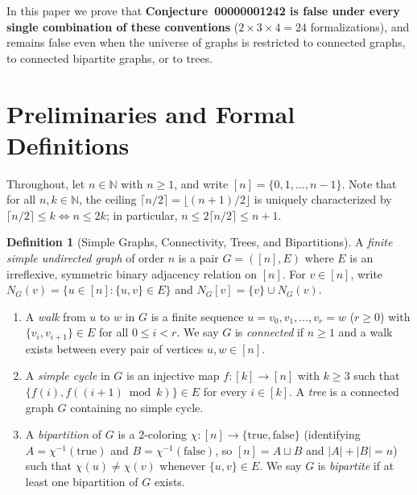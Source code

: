 \documentclass[11pt,a4paper]{article}
\theoremstyle{definition}
\newtheorem{definition}[theorem]{Definition}
\newcommand{\ceilhalf}[1]{\lceil #1 / 2 \rceil}
\begin{document}
In this paper we prove that \textbf{Conjecture~00000001242 is false under every
single combination of these conventions} ($2 \times 3 \times 4 = 24$ formalizations),
and remains false even when the universe of graphs is restricted to connected
graphs, to connected bipartite graphs, or to trees.

\section{Preliminaries and Formal Definitions}

Throughout, let $n \in \mathbb{N}$ with $n \ge 1$, and write $[n] = \{0, 1, \dots, n-1\}$.
Note that for all $n, k \in \mathbb{N}$, the ceiling $\ceilhalf{n} = \lfloor (n+1)/2 \rfloor$
is uniquely characterized by $\ceilhalf{n} \le k \iff n \le 2k$; in particular,
$n \le 2\ceilhalf{n} \le n + 1$.

\begin{definition}[Simple Graphs, Connectivity, Trees, and Bipartitions]
\label{def:graphs}
A \emph{finite simple undirected graph} of order $n$ is a pair $G = ([n], E)$
where $E$ is an irreflexive, symmetric binary adjacency relation on $[n]$. For
$v \in [n]$, write $N_G(v) = \{u \in [n] : \{u, v\} \in E\}$ and
$N_G[v] = \{v\} \cup N_G(v)$.
\begin{enumerate}
\item[(i)] A \emph{walk} from $u$ to $w$ in $G$ is a finite sequence
$u = v_0, v_1, \dots, v_r = w$ ($r \ge 0$) with $\{v_i, v_{i+1}\} \in E$ for all
$0 \le i < r$. We say $G$ is \emph{connected} if $n \ge 1$ and a walk exists
between every pair of vertices $u, w \in [n]$.
\item[(ii)] A \emph{simple cycle} in $G$ is an injective map $f : [k] \to [n]$ with
$k \ge 3$ such that $\{f(i), f((i+1) \bmod k)\} \in E$ for every $i \in [k]$.
A \emph{tree} is a connected graph $G$ containing no simple cycle.
\item[(iii)] A \emph{bipartition} of $G$ is a $2$-coloring $\chi : [n] \to \{\mathrm{true}, \mathrm{false}\}$
(identifying $A = \chi^{-1}(\mathrm{true})$ and $B = \chi^{-1}(\mathrm{false})$, so
$[n] = A \sqcup B$ and $|A| + |B| = n$) such that $\chi(u) \neq \chi(v)$ whenever
$\{u, v\} \in E$. We say $G$ is \emph{bipartite} if at least one bipartition of $G$ exists.
\end{enumerate}
\end{definition}
\end{document}
